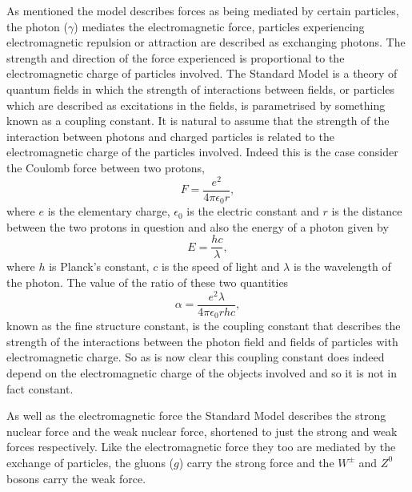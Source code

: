 As mentioned the model describes forces as being mediated by certain particles,
the photon ($\gamma$) mediates the electromagnetic force, particles experiencing
electromagnetic repulsion or attraction are described as exchanging photons. The
strength and direction of the force experienced is proportional to the
electromagnetic charge of particles involved. The Standard Model is a theory of
quantum fields in which the strength of interactions between fields, or
particles which are described as excitations in the fields, is parametrised by
something known as a coupling constant. It is natural to assume that the
strength of the interaction between photons and charged particles is related to
the electromagnetic charge of the particles involved. Indeed this is the case
consider the Coulomb force between two protons,
\begin{equation}
  F = \frac{e^2}{4\pi\epsilon_0r},
\end{equation}
where $e$ is the elementary charge, $\epsilon_0$ is the electric constant and
$r$ is the distance between the two protons in question and also the
energy of a photon given by
\begin{equation}
  E = \frac{hc}{\lambda},
\end{equation}
where $h$ is Planck's constant, $c$ is the speed of light and $\lambda$ is the
wavelength of the photon. The value of the ratio of these two quantities
\begin{equation}
  \label{eq:fine-structure}
  \alpha = \frac{e^{2}\lambda}{4\pi\epsilon_{0}rhc},
\end{equation}
known as the fine structure constant, is the coupling constant that describes
the strength of the interactions between the photon field and fields of
particles with electromagnetic charge. So as is now clear this coupling constant
does indeed depend on the electromagnetic charge of the objects involved and so
it is not in fact constant.

As well as the electromagnetic force the Standard Model describes the strong
nuclear force and the weak nuclear force, shortened to just the strong and weak
forces respectively. Like the electromagnetic force they too are mediated by the
exchange of particles, the gluons ($g$) carry the strong force and the $W^\pm$
and $Z^0$ bosons carry the weak force.

